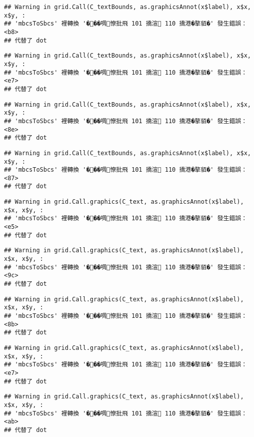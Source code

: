 \documentclass[
]{article}
\begin{document}
\begin{verbatim}
## Warning in grid.Call(C_textBounds, as.graphicsAnnot(x$label), x$x, x$y, :
## 'mbcsToSbcs' 裡轉換 '���啁憭批飛 101 撟渲 110 撟港�摮貊�' 發生錯誤：<b8>
## 代替了 dot
\end{verbatim}

\begin{verbatim}
## Warning in grid.Call(C_textBounds, as.graphicsAnnot(x$label), x$x, x$y, :
## 'mbcsToSbcs' 裡轉換 '���啁憭批飛 101 撟渲 110 撟港�摮貊�' 發生錯誤：<e7>
## 代替了 dot
\end{verbatim}

\begin{verbatim}
## Warning in grid.Call(C_textBounds, as.graphicsAnnot(x$label), x$x, x$y, :
## 'mbcsToSbcs' 裡轉換 '���啁憭批飛 101 撟渲 110 撟港�摮貊�' 發生錯誤：<8e>
## 代替了 dot
\end{verbatim}

\begin{verbatim}
## Warning in grid.Call(C_textBounds, as.graphicsAnnot(x$label), x$x, x$y, :
## 'mbcsToSbcs' 裡轉換 '���啁憭批飛 101 撟渲 110 撟港�摮貊�' 發生錯誤：<87>
## 代替了 dot
\end{verbatim}

\begin{verbatim}
## Warning in grid.Call.graphics(C_text, as.graphicsAnnot(x$label), x$x, x$y, :
## 'mbcsToSbcs' 裡轉換 '���啁憭批飛 101 撟渲 110 撟港�摮貊�' 發生錯誤：<e5>
## 代替了 dot
\end{verbatim}

\begin{verbatim}
## Warning in grid.Call.graphics(C_text, as.graphicsAnnot(x$label), x$x, x$y, :
## 'mbcsToSbcs' 裡轉換 '���啁憭批飛 101 撟渲 110 撟港�摮貊�' 發生錯誤：<9c>
## 代替了 dot
\end{verbatim}

\begin{verbatim}
## Warning in grid.Call.graphics(C_text, as.graphicsAnnot(x$label), x$x, x$y, :
## 'mbcsToSbcs' 裡轉換 '���啁憭批飛 101 撟渲 110 撟港�摮貊�' 發生錯誤：<8b>
## 代替了 dot
\end{verbatim}

\begin{verbatim}
## Warning in grid.Call.graphics(C_text, as.graphicsAnnot(x$label), x$x, x$y, :
## 'mbcsToSbcs' 裡轉換 '���啁憭批飛 101 撟渲 110 撟港�摮貊�' 發生錯誤：<e7>
## 代替了 dot
\end{verbatim}

\begin{verbatim}
## Warning in grid.Call.graphics(C_text, as.graphicsAnnot(x$label), x$x, x$y, :
## 'mbcsToSbcs' 裡轉換 '���啁憭批飛 101 撟渲 110 撟港�摮貊�' 發生錯誤：<ab>
## 代替了 dot
\end{verbatim}
\end{document}
